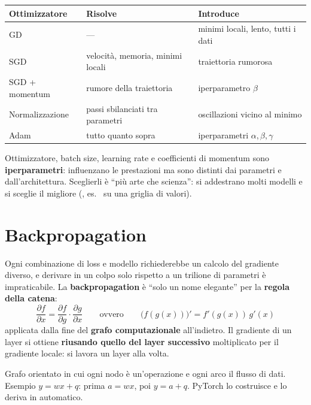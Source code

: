 \begin{sintesi}[ottimizzatori]
\begin{center}
\small
\begin{tabular}{lll}
\toprule
\textbf{Ottimizzatore} & \textbf{Risolve} & \textbf{Introduce}\\
\midrule
GD & --- & minimi locali, lento, tutti i dati\\
SGD & velocità, memoria, minimi locali & traiettoria rumorosa\\
SGD + momentum & rumore della traiettoria & iperparametro $\beta$\\
Normalizzazione & passi sbilanciati tra parametri & oscillazioni vicino al minimo\\
Adam & tutto quanto sopra & iperparametri $\alpha,\beta,\gamma$\\
\bottomrule
\end{tabular}
\end{center}
Ottimizzatore, batch size, learning rate e coefficienti di momentum sono \textbf{iperparametri}: influenzano le prestazioni
ma sono distinti dai parametri e dall'architettura. Sceglierli è ``più arte che scienza'': si addestrano molti modelli e si
sceglie il migliore (, es.\  su una griglia di valori).
\end{sintesi}

\section{Backpropagation}
Ogni combinazione di loss e modello richiederebbe un calcolo del gradiente diverso, e derivare in un colpo solo rispetto a un
trilione di parametri è impraticabile. La \textbf{backpropagation} è ``solo un nome elegante'' per la \textbf{regola della
catena}:
\[
\frac{\partial f}{\partial x} = \frac{\partial f}{\partial g}\cdot\frac{\partial g}{\partial x}
\qquad\text{ovvero}\qquad \big(f(g(x))\big)' = f'(g(x))\,g'(x)
\]
applicata dalla fine del \textbf{grafo computazionale} all'indietro. Il gradiente di un layer si ottiene
\textbf{riusando quello del layer successivo} moltiplicato per il gradiente locale: si lavora un layer alla volta.

\begin{definizione}
Grafo orientato in cui ogni nodo è un'operazione e ogni arco il flusso di dati. Esempio $y = wx + q$:
prima $a = wx$, poi $y = a + q$. PyTorch lo costruisce e lo deriva in automatico.
\end{definizione}

